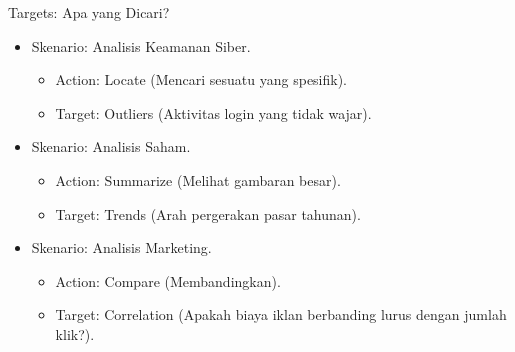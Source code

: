 \documentclass[t]{beamer}
\begin{document}
\begin{frame}{Targets: Apa yang Dicari?}
\begin{itemize}
	\item Skenario: Analisis Keamanan Siber.
		\begin{itemize}
			\item Action: Locate (Mencari sesuatu yang spesifik).
			\item Target: Outliers (Aktivitas login yang tidak wajar).
		\end{itemize}
	\item Skenario: Analisis Saham.
		\begin{itemize}
			\item Action: Summarize (Melihat gambaran besar).
			\item Target: Trends (Arah pergerakan pasar tahunan).
		\end{itemize}
	\item Skenario: Analisis Marketing.
		\begin{itemize}
			\item Action: Compare (Membandingkan).
			\item Target: Correlation (Apakah biaya iklan berbanding lurus dengan jumlah klik?).
		\end{itemize}
\end{itemize}
\end{frame}
\end{document}
